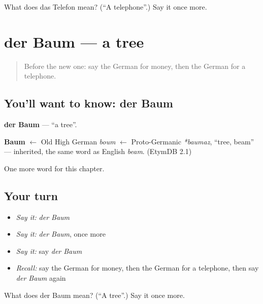 \begin{tcolorbox}[breakable,colback=teal!4,colframe=teal!35!black,title={Before you move on}]
What does das Telefon mean? (\textquotedblleft{}A telephone\textquotedblright{}.) Say it once more.
\end{tcolorbox}
\section[der Baum]{der Baum — a tree}

\label{lesson:GE-C82-baum}



\begin{quote}
Before the new one: say the German for money, then the German for a telephone.
\end{quote}

\subsection*{You'll want to know: der Baum}
\textbf{der Baum} — \textquotedblleft{}a tree\textquotedblright{}.

\begin{cousinweb}
\textbf{Baum} $\leftarrow$ Old High German \emph{boum} $\leftarrow$ Proto-Germanic \emph{*baumaz}, \textquotedblleft{}tree, beam\textquotedblright{} — inherited, the same word as English \emph{beam}. (EtymDB 2.1)
\end{cousinweb}

\begin{grammarlens}[title={What you've built}]
One more word for this chapter.
\end{grammarlens}

\subsection*{Your turn}
\begin{itemize}
\raggedright
  \item \emph{Say it:} \emph{der Baum}
  \item \emph{Say it:} \emph{der Baum}, once more
  \item \emph{Say it:} say \emph{der Baum}
  \item \emph{Recall:} say the German for money, then the German for a telephone, then say \emph{der Baum} again
\end{itemize}

\begin{tcolorbox}[breakable,colback=teal!4,colframe=teal!35!black,title={Before you move on}]
What does der Baum mean? (\textquotedblleft{}A tree\textquotedblright{}.) Say it once more.
\end{tcolorbox}
